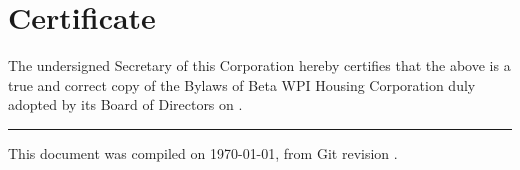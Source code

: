 \chapter*{Certificate}

\thispagestyle{certificate}

The undersigned Secretary of this Corporation hereby certifies that the above
is a true and correct copy of the Bylaws of Beta WPI Housing Corporation duly
adopted by its Board of Directors on \dateadopted.

\vspace{0.4in}

\rule{3in}{0.8pt}

\vfill

\begin{center} 

\small This document was compiled on \today, from Git revision \Revision. 

\end{center}
